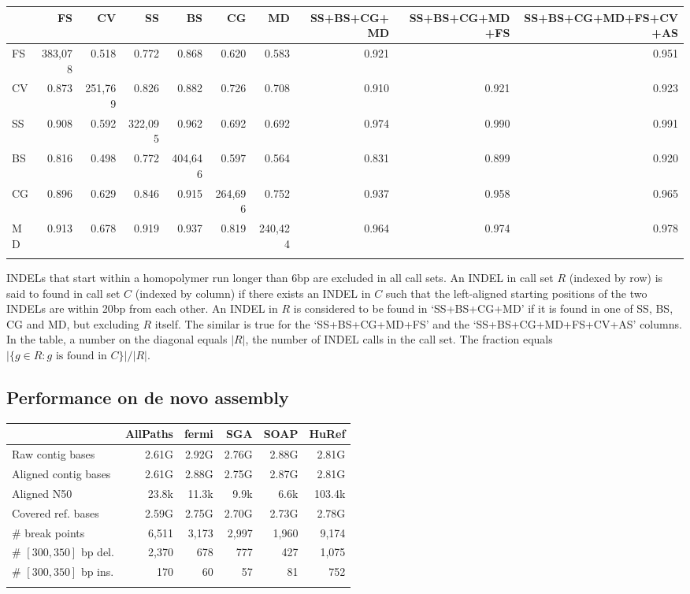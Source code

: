 \documentclass{bioinfo}
\begin{document}
\begin{table*}[!htb]
{\begin{tabular*}{\textwidth}{@{\extracolsep{\fill}}lrrrrrrrrr}
\toprule
&FS&CV&SS&BS&CG&MD&SS+BS+CG+MD&SS+BS+CG+MD+FS&SS+BS+CG+MD+FS+CV+AS\\
\midrule
FS&383,078& 0.518 & 0.772 & 0.868 & 0.620 & 0.583 & 0.921 &       & 0.951\\
CV& 0.873 &251,769& 0.826 & 0.882 & 0.726 & 0.708 & 0.910 & 0.921 & 0.923\\
SS& 0.908 & 0.592 &322,095& 0.962 & 0.692 & 0.692 & 0.974 & 0.990 & 0.991\\
BS& 0.816 & 0.498 & 0.772 &404,646& 0.597 & 0.564 & 0.831 & 0.899 & 0.920\\
CG& 0.896 & 0.629 & 0.846 & 0.915 &264,696& 0.752 & 0.937 & 0.958 & 0.965\\
MD& 0.913 & 0.678 & 0.919 & 0.937 & 0.819 &240,424& 0.964 & 0.974 & 0.978\\
\botrule
\end{tabular*}}
{INDELs that start within a homopolymer run longer than 6bp are excluded in
all call sets. An INDEL in call set $R$ (indexed by row) is said to
found in call set $C$ (indexed by column) if there exists an INDEL in $C$
such that the left-aligned starting positions of the two INDELs are within 20bp
from each other.  An INDEL in $R$ is considered to be found in
`\mbox{SS+BS+CG+MD}' if it is found in one of SS, BS, CG and MD, but excluding $R$
itself. The similar is true for the `\mbox{SS+BS+CG+MD+FS}' and the
`\mbox{SS+BS+CG+MD+FS+CV+AS}' columns. In the table, a number on the diagonal equals $|R|$,
the number of INDEL calls in the call set. The fraction equals $|\{g\in R:g
\mbox{ is found in } C\}|/|R|$.}

\end{table*}

\subsection{Performance on de novo assembly}

\begin{table}[!htb]
{\begin{tabular}{lrrrrr}
\toprule
& AllPaths & fermi & SGA & SOAP & HuRef \\
\midrule
Raw contig bases & 2.61G & 2.92G & 2.76G & 2.88G & 2.81G \\
Aligned contig bases & 2.61G & 2.88G & 2.75G & 2.87G & 2.81G \\
Aligned N50 & 23.8k & 11.3k & 9.9k & 6.6k & 103.4k \\
Covered ref. bases & 2.59G & 2.75G & 2.70G & 2.73G & 2.78G \\
\# break points & 6,511 & 3,173 & 2,997 & 1,960 & 9,174 \\
\# $[300,350]$ bp del. & 2,370 & 678 & 777 & 427 & 1,075 \\
\# $[300,350]$ bp ins. & 170 & 60 & 57 & 81 & 752 \\
\botrule
\end{tabular}}{}
\end{table}
\end{document}
